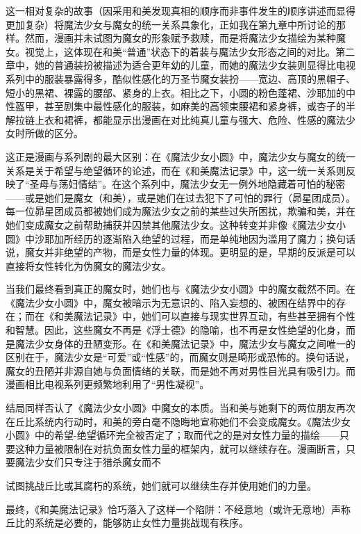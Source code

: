 这一相对复杂的故事（因采用和美发现真相的顺序而非事件发生的顺序讲述而显得更加复杂）将魔法少女与魔女的统一关系具象化，正如我在第九章中所讨论的那样。然而，漫画并未试图为魔女的形象赋予救赎，而是将魔法少女描绘为某种魔女。视觉上，这体现在和美“普通”状态下的着装与魔法少女形态之间的对比。第二章中，她的普通装扮被描述为适合更年幼的儿童，而她的魔法少女装则显得比电视系列中的服装暴露得多，酷似性感化的万圣节魔女装扮——宽边、高顶的黑帽子、短小的黑裙、裸露的腰部、紧身的上衣。相比之下，小圆的粉色蓬裙、沙耶加的中性盔甲，甚至剧集中最性感化的服装，如麻美的高领束腰裙和紧身裤，或杏子的半解拉链上衣和裙裤，都能显示出漫画在对比纯真儿童与强大、危险、性感的魔法少女时所做的区分。

这正是漫画与系列剧的最大区别：在《魔法少女小圆》中，魔法少女与魔女的统一关系是关于希望与绝望循环的论述，而在《和美魔法记录》中，这一统一关系则反映了“圣母与荡妇情结”。在这个系列中，魔法少女无一例外地隐藏着可怕的秘密——或是她们是魔女（和美），或是她们在过去犯下了可怕的罪行（昴星团成员）。每一位昴星团成员都被她们成为魔法少女之前的某些过失所困扰，欺骗和美，并在她们变成魔女之前帮助捕获并囚禁其他魔法少女。这种转变并非像《魔法少女小圆》中沙耶加所经历的逐渐陷入绝望的过程，而是单纯地因为滥用了魔力；换句话说，魔女并非绝望的产物，而是女性力量的体现。更明显的是，早期的反派是可以直接将女性转化为伪魔女的魔法少女。

当我们最终看到真正的魔女时，她们也与《魔法少女小圆》中的魔女截然不同。在《魔法少女小圆》中，魔女被暗示为无意识的、陷入妄想的、被困在结界中的存在；而在《和美魔法记录》中，她们可以直接与现实世界互动，有些甚至拥有个性和智慧。因此，这些魔女不再是《浮士德》的隐喻，也不再是女性绝望的化身，而是魔法少女身体的丑陋变形。在《和美魔法记录》中，魔法少女与魔女之间唯一的区别在于，魔法少女是“可爱”或“性感”的，而魔女则是畸形或恐怖的。换句话说，魔女的丑陋并非源自她与负面情绪的关联，而是她不再对男性目光具有吸引力。而漫画相比电视系列更频繁地利用了“男性凝视”。

结局同样否认了《魔法少女小圆》中魔女的本质。当和美与她剩下的两位朋友再次在丘比系统内行动时，和美的旁白毫不隐晦地宣称她们不会变成魔女。《魔法少女小圆》中的希望-绝望循环完全被否定了；取而代之的是对女性力量的描绘——只要这种力量被限制在对抗负面女性力量的框架内，就可以继续存在。漫画断言，只要魔法少女们只专注于猎杀魔女而不

试图挑战丘比或其腐朽的系统，她们就可以继续生存并使用她们的力量。

最终，《和美魔法记录》恰巧落入了这样一个陷阱：不经意地（或许无意地）声称丘比的系统是必要的，能够防止女性力量挑战现有秩序。